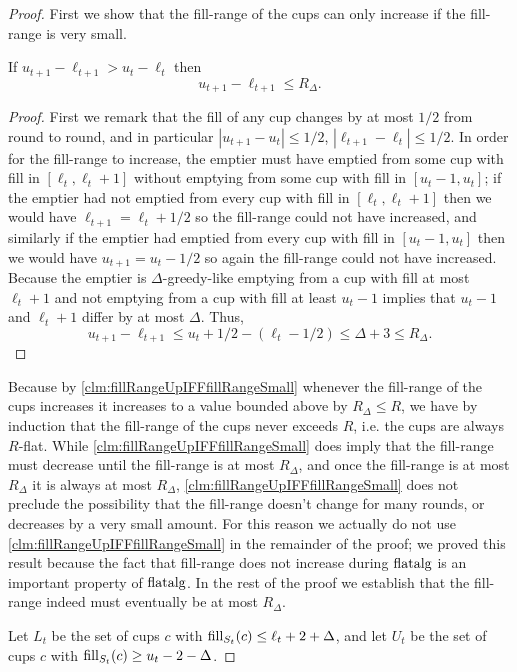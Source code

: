 \begin{proof}
  First we show that the fill-range of the cups can only increase
  if the fill-range is very small.
  \begin{clm}
    \label{clm:fillRangeUpIFFfillRangeSmall}
    If $u_{t+1}-\ell_{t+1} > u_t - \ell_t$ then 
    $$u_{t+1} - \ell_{t+1} \le R_\Delta.$$
  \end{clm}
  \begin{proof}
    First we remark that the fill of any cup changes by at most
    $1/2$ from round to round, and in particular $|u_{t+1}-u_t|
    \le 1/2$, $|\ell_{t+1} - \ell_t|\le 1/2$.
  In order for the fill-range to increase, the emptier must have
  emptied from some cup with fill in $[\ell_t, \ell_t + 1]$ without
  emptying from some cup with fill in $[u_t-1, u_t]$; if the emptier
  had not emptied from every cup with fill in $[\ell_t, \ell_t+1]$
  then we would have $\ell_{t+1} = \ell_t + 1/2$ so the
  fill-range could not have increased, and similarly if the emptier
  had emptied from every cup with fill in $[u_t-1, u_t]$ then we
  would have $u_{t+1} = u_t - 1/2$ so again the fill-range could
  not have increased. Because the emptier is $\Delta$-greedy-like
  emptying from a cup with fill at most $\ell_t+1$ and not
  emptying from a cup with fill at least $u_t-1$ implies that
  $u_t-1$ and $\ell_t+1$ differ by at most $\Delta$.
  Thus, 
  $$u_{t+1} - \ell_{t+1} \le u_t +1/2 - (\ell_t -1/2)  \le \Delta + 3 \le R_\Delta.$$
  \end{proof}
  Because by
  \cref{clm:fillRangeUpIFFfillRangeSmall}
  whenever the fill-range of the cups increases it increases to a
  value bounded above by $R_\Delta \le R$, we have by induction
  that the fill-range of the cups never exceeds $R$, i.e. the
  cups are always $R$-flat. While
  \cref{clm:fillRangeUpIFFfillRangeSmall}
  does imply that the fill-range must decrease until the
  fill-range is at most $R_\Delta$, and once the fill-range is at
  most $R_\Delta$ it is always at most $R_\Delta$,
  \cref{clm:fillRangeUpIFFfillRangeSmall}
  does not preclude the possibility that the fill-range doesn't
  change for many rounds, or decreases by a very small amount.
  For this reason we actually do not use
  \cref{clm:fillRangeUpIFFfillRangeSmall}
  in the remainder of the proof; we proved this result because
  the fact that fill-range does not increase during $\operatorname{\text{\textup{flatalg}}}$ is
  an important property of $\operatorname{\text{\textup{flatalg}}}$. In the rest of the proof
  we establish that the fill-range indeed must eventually be at
  most $R_\Delta$.

  Let $L_t$ be the set of cups $c$ with $\operatorname{\text{\textup{fill}}}_{S_t}(c) \le \ell_t+2+\Delta$, and let
  $U_t$ be the set of cups $c$ with $\operatorname{\text{\textup{fill}}}_{S_t}(c) \ge u_t-2-\Delta$.


\end{proof}
